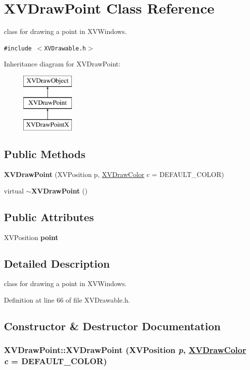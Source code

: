 \hypertarget{class_XVDrawPoint}{
\section{XVDraw\-Point  Class Reference}
\label{XVDrawPoint}
}
class for drawing a point in XVWindows. 


{\tt \#include $<$XVDrawable.h$>$}

Inheritance diagram for XVDraw\-Point:\begin{figure}[H]
\begin{center}
\leavevmode
\includegraphics[height=3cm]{class_XVDrawPoint}
\end{center}
\end{figure}
\subsection*{Public Methods}
\begin{CompactItemize}
\item 
{\bf XVDraw\-Point} (XVPosition p, \hyperlink{class_XVDrawColor}{XVDraw\-Color} c = DEFAULT\_\-COLOR)
\item 
virtual {\bf $\sim$XVDraw\-Point} ()
\end{CompactItemize}
\subsection*{Public Attributes}
\begin{CompactItemize}
\item 
XVPosition {\bf point}
\end{CompactItemize}


\subsection{Detailed Description}
class for drawing a point in XVWindows.





Definition at line 66 of file XVDrawable.h.

\subsection{Constructor \& Destructor Documentation}
\label{XVDrawPoint_a0}
\hypertarget{class_XVDrawPoint_a0}{
\subsubsection[XVDrawPoint]{\setlength{\rightskip}{0pt plus 5cm}XVDraw\-Point::XVDraw\-Point (XVPosition {\em p}, \hyperlink{class_XVDrawColor}{XVDraw\-Color} {\em c} = DEFAULT\_\-COLOR)}}




